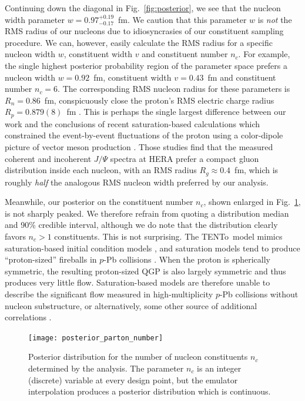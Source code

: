 \documentclass[aps,prc,reprint,amsmath,nofootinbib]{revtex4-1}
\newcommand{\trento}{T\raisebox{-0.5ex}{R}ENTo}
\begin{document}
Continuing down the diagonal in Fig.~\ref{fig:posterior}, we see that the nucleon width parameter $w=0.97_{-0.17}^{+0.19}$~fm.
We caution that this parameter $w$ is \emph{not} the RMS radius of our nucleons due to idiosyncrasies of our constituent sampling procedure.
We can, however, easily calculate the RMS radius for a specific nucleon width $w$, constituent width $v$ and constituent number $n_c$.
For example, the single highest posterior probability region of the parameter space prefers a nucleon width $w=0.92$~fm, constituent width $v=0.43$~fm and constituent number $n_c=6$.
The corresponding RMS nucleon radius for these parameters is $R_n = 0.86$~fm, conspicuously close the proton's RMS electric charge radius $R_p = 0.879(8)$~fm \cite{Bernauer:2010wm}.
This is perhaps the single largest difference between our work and the conclusions of recent saturation-based calculations which constrained the event-by-event fluctuations of the proton using a color-dipole picture of vector meson production \cite{Mantysaari:2016ykx, Mantysaari:2016jaz}.
Those studies find that the measured coherent and incoherent $J/\Psi$ spectra at HERA prefer a compact gluon distribution inside each nucleon, with an RMS radius $R_g \approx 0.4$~fm, which is roughly \emph{half} the analogous RMS nucleon width preferred by our analysis.

Meanwhile, our posterior on the constituent number $n_c$, shown enlarged in Fig.~\ref{fig:posterior_parton_number}, is not sharply peaked.
We therefore refrain from quoting a distribution median and 90\% credible interval, although we do note that the distribution clearly favors $n_c > 1$ constituents.
This is not surprising.
The \trento\ model mimics saturation-based initial condition models \cite{Bernhard:2016tnd}, and saturation models tend to produce ``proton-sized'' fireballs in $p$-Pb collisions \cite{Bzdak:2013zma}.
When the proton is spherically symmetric, the resulting proton-sized QGP is also largely symmetric and thus produces very little flow.
Saturation-based models are therefore unable to describe the significant flow measured in high-multiplicity $p$-Pb collisions without nucleon substructure, or alternatively, some other source of additional correlations \cite{Schenke:2017bog}.

\begin{figure}[t]
  \texttt{[image: posterior\_parton\_number]}
  \caption{\label{fig:posterior_parton_number}
    Posterior distribution for the number of nucleon constituents $n_c$ determined by the analysis.
    The parameter $n_c$ is an integer (discrete) variable at every design point, but the emulator interpolation produces a posterior distribution which is continuous.
  }
\end{figure}
\end{document}
